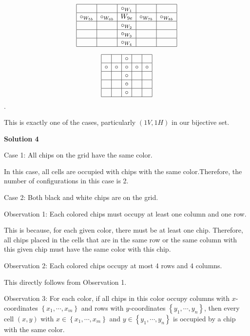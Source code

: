 \begin{enumerate}
 \[\begin{array}{|c|c|c|c|c|} \hline & & \circ_{W_1} & & \\ \hline \circ_{W_{5b}} & \circ_{W_{6b}} & W_{9e} & \circ_{W_{7b}} & \circ_{W_{8b}} \\ \hline & & \circ_{W_2} & & \\ \hline & & \circ_{W_3} & & \\ \hline & & \circ_{W_4} & & \\ \hline \end{array}\]

 \[\begin{array}{|c|c|c|c|c|} \hline & & \circ & & \\ \hline \circ & \circ & \circ & \circ & \circ \\ \hline & & \circ & & \\ \hline & & \circ & & \\ \hline & & \circ & & \\ \hline \end{array}\].

 This is exactly one of the cases, particularly $(1V,1H)$ in our bijective set.

 



\textbf{Solution 4}

Case 1: All chips on the grid have the same color.

 In this case, all cells are occupied with chips with the same color.Therefore, the number of configurations in this case is 2.

 Case 2: Both black and white chips are on the grid.

 Observation 1: Each colored chips must occupy at least one column and one row.

 This is because, for each given color, there must be at least one chip. Therefore, all chips placed in the cells that are in the same row or the same column with this given chip must have the same color with this chip.

 Observation 2: Each colored chips occupy at most 4 rows and 4 columns.

 This directly follows from Observation 1.

 Observation 3: For each color, if all chips in this color occupy columns with $x$-coordinates $\left\{ x_1, \cdots, x_m \right\}$ and rows with $y$-coordinates $\left\{ y_1, \cdots, y_n \right\}$, then every cell $\left( x, y \right)$ with $x \in \left\{ x_1, \cdots , x_m \right\}$ and $y \in \left\{ y_1, \cdots , y_n \right\}$ is occupied by a chip with the same color.


\end{enumerate}
